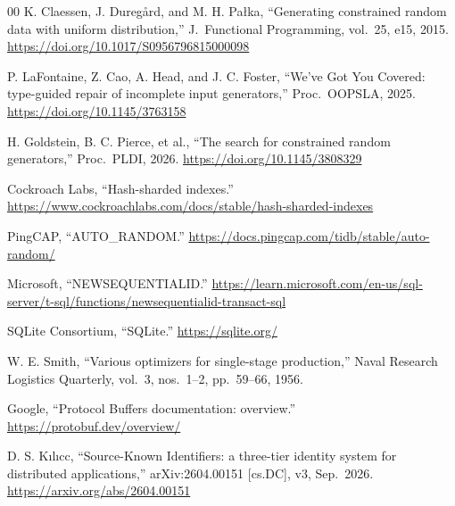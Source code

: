 \documentclass{svproc}
\begin{document}
\begin{thebibliography}{00}
K. Claessen, J. Dureg{\aa}rd, and M. H. Pa{\l}ka, ``Generating constrained random data with uniform distribution,'' J.\ Functional Programming, vol.\ 25, e15, 2015. \url{https://doi.org/10.1017/S0956796815000098}

P. LaFontaine, Z. Cao, A. Head, and J. C. Foster, ``We've Got You Covered: type-guided repair of incomplete input generators,'' Proc.\ OOPSLA, 2025. \url{https://doi.org/10.1145/3763158}

H. Goldstein, B. C. Pierce, et al., ``The search for constrained random generators,'' Proc.\ PLDI, 2026. \url{https://doi.org/10.1145/3808329}

Cockroach Labs, ``Hash-sharded indexes.'' \url{https://www.cockroachlabs.com/docs/stable/hash-sharded-indexes}

PingCAP, ``AUTO\_RANDOM.'' \url{https://docs.pingcap.com/tidb/stable/auto-random/}

Microsoft, ``NEWSEQUENTIALID.'' \url{https://learn.microsoft.com/en-us/sql-server/t-sql/functions/newsequentialid-transact-sql}

SQLite Consortium, ``SQLite.'' \url{https://sqlite.org/}

W. E. Smith, ``Various optimizers for single-stage production,'' Naval Research Logistics Quarterly, vol.\ 3, nos.\ 1--2, pp.\ 59--66, 1956.

Google, ``Protocol Buffers documentation: overview.'' \url{https://protobuf.dev/overview/}

D. S. K{\i}l{\i}c{c}, ``Source-Known Identifiers: a three-tier identity system for distributed applications,'' arXiv:2604.00151 [cs.DC], v3, Sep.~2026. \url{https://arxiv.org/abs/2604.00151}

\end{thebibliography}
\end{document}
